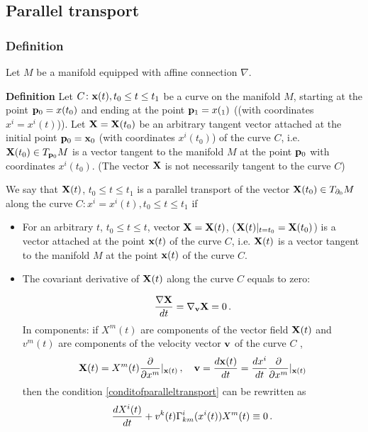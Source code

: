 \documentclass[12pt]{article}
\theoremstyle{theorem}
\numberwithin{equation}{section}
\begin{document}
{   \subsection{Parallel transport}\label{paralleltransport}



\subsubsection {Definition}

   Let $M$ be a manifold equipped with affine connection $\nabla$.

   {\bf Definition} Let $C\colon {\bf x}(t), t_0\leq t\leq t_1$ 
     be a curve on the manifold $M$,
   starting at the point ${\bf p}_0=x(t_0)$ and ending at the point
    ${\bf p}_1=x(_1)$ ((with coordinates $x^i=x^i(t)$)).
   Let ${\bf X}={\bf X}(t_0)$ be an arbitrary tangent  vector 
attached at the initial point ${\bf p}_0={\bf x}_0$ 
(with coordinates $x^i(t_0)$) of the curve $C$, i.e.
  ${\bf X}(t_0)\in T_{{\bf p}_0}M$ is a vector tangent to the manifold $M$
  at the point ${\bf p}_0$ with coordinates $x^i(t_0)$.
  (The vector ${\bf X}$ is not necessarily tangent to the curve $C$)

  We say that ${\bf X}(t)$, $t_0\leq t\leq t_1$ is a parallel transport of the
  vector ${\bf X}(t_0)\in T_{\partial_0}M$ along the curve $C\colon x^i=x^i(t), t_0\leq t\leq t_1$ if

\begin {itemize}

\item For an arbitrary $t$, $t_0\leq t\leq t$, vector ${\bf X}={\bf X}(t)$, (${\bf X}(t)\vert_{t=t_0}={\bf X}(t_0)$)
 is a vector attached at the point
  ${\bf x}(t)$ of the curve $C$,
 i.e. ${\bf X}(t)$ is a vector tangent to the manifold $M$
  at the point ${\bf x}(t)$  of the curve $C$.

  \item The covariant derivative of ${\bf X}(t)$ along the curve $C$ equals to zero:

  \begin{equation}\label{conditofparalleltransport}
    {\nabla {\bf X}\over dt}=\nabla_{\bf v} {\bf X}=0\,.
  \end{equation}
 In components: if $X^m(t)$ are components of the vector field ${\bf X}(t)$
 and   $v^m(t)$ are components of the velocity vector ${\bf v}$ of the curve  $C$ ,
                $$
                {\bf X}(t)=X^m(t){\partial \over \partial x^m}\vert_{{\bf x}(t)}\,,\quad
                {\bf v}={d{\bf x}(t)\over dt}={dx^i\over dt}{\partial \over \partial x^m}\vert_{{\bf x}(t)}
                $$
  then the condition \eqref{conditofparalleltransport} can be rewritten as
  \begin{equation}\label{conditofparalleltransportcomponents}
    {dX^i(t)\over dt}+v^k(t)\Gamma^i_{km}(x^i(t))X^m(t)\equiv 0\,.
  \end{equation}



\end{itemize}}
\end{document}
